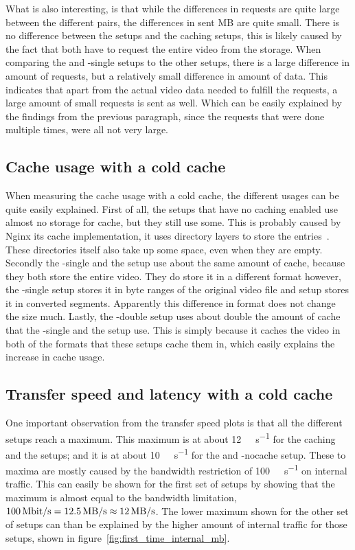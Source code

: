 \documentclass[twoside,openright]{uva-bachelor-thesis}
\newcommand{\mbps}[1]{\SI[per-mode=symbol]{#1}{\mega\bit\per\second}}
\newcommand{\Mbps}[1]{\SI[per-mode=symbol]{#1}{\mega\byte\per\second}}
\begin{document}
What is also interesting, is that while the differences in requests are quite
large between the different pairs, the differences in sent MB are quite small.
There is no difference between the \cdn setups and the caching \lt setups, this
is likely caused by the fact that both have to request the entire video from the
storage. When comparing the \ipp and \lt-single setups to the other setups,
there is a large difference in amount of requests, but a relatively small
difference in amount of data. This indicates that apart from the actual video
data needed to fulfill the requests, a large amount of small requests is sent
as well.  Which can be easily explained by the findings from the previous
paragraph, since the requests that were done multiple times, were all not very
large.

\subsection{Cache usage with a cold cache}
When measuring the cache usage with a cold cache, the different usages can be
quite easily explained. First of all, the setups that have no caching enabled
use almost no storage for cache, but they still use some. This is probably
caused by Nginx its cache implementation, it uses directory layers to store the
entries~\autocite{nginxcachelevels}. These directories itself also take up some
space, even when they are empty. Secondly the \lt-single and the \cdn setup use
about the same amount of cache, because they both store the entire video. They
do store it in a different format however, the \lt-single setup stores it in
byte ranges of the original video file and \cdn setup stores it in converted segments.
Apparently this difference in format does not change the size much. Lastly, the
\lt-double setup uses about double the amount of cache that the \lt-single and
the \cdn setup use. This is simply because it caches the video in both of the
formats that these setups cache them in, which easily explains the increase in
cache usage.

\subsection{Transfer speed and latency with a cold cache}
One important observation from the transfer speed plots is that all the
different setups reach a maximum. This maximum is at about \Mbps{12} for the
caching \lt and the \cdn setups; and it is at about \Mbps{10} for the
\ipp and \lt-nocache setup. These to maxima are mostly caused by the bandwidth
restriction of \mbps{100} on internal traffic. This can easily be shown for the
first set of setups by showing that the maximum is almost equal to the bandwidth
limitation, $\mbps{100} = \Mbps{12.5} \approx
\Mbps{12}$. The lower maximum shown for the other set of setups can than be
explained by the higher amount of internal traffic for those setups, shown in
figure~\ref{fig:first_time_internal_mb}.
\end{document}
